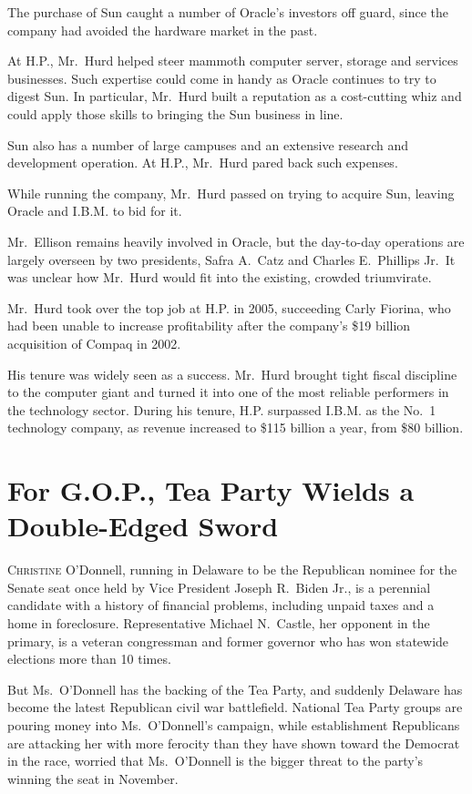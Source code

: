 ﻿\documentclass[12pt]{article}
\begin{document}
The purchase of Sun caught a number of Oracle's investors off guard, since the company had avoided
the hardware market in the past.

At H.P., Mr.~Hurd helped steer mammoth computer server, storage and services businesses. Such
expertise could come in handy as Oracle continues to try to digest Sun. In particular, Mr.~Hurd
built a reputation as a cost-cutting whiz and could apply those skills to bringing the Sun business
in line.

Sun also has a number of large campuses and an extensive research and development operation. At
H.P., Mr.~Hurd pared back such expenses.

While running the company, Mr.~Hurd passed on trying to acquire Sun, leaving Oracle and I.B.M. to
bid for it.

Mr.~Ellison remains heavily involved in Oracle, but the day-to-day operations are largely overseen
by two presidents, Safra A.~Catz and Charles E.~Phillips Jr.~It was unclear how Mr.~Hurd would fit
into the existing, crowded triumvirate.

Mr.~Hurd took over the top job at H.P. in 2005, succeeding Carly Fiorina, who had been unable to
increase profitability after the company's \$19 billion acquisition of Compaq in 2002.

His tenure was widely seen as a success. Mr.~Hurd brought tight fiscal discipline to the computer
giant and turned it into one of the most reliable performers in the technology sector. During his
tenure, H.P. surpassed I.B.M. as the No.~1 technology company, as revenue increased to \$115 billion
a year, from \$80 billion.

\pagebreak
\section{For G.O.P., Tea Party Wields a Double-Edged Sword}

\lettrine{C}{hristine} O'Donnell, running in Delaware to be the Republican
nominee for the Senate seat once held by Vice President Joseph R.~Biden Jr., is a perennial
candidate with a history of financial problems, including unpaid taxes and a home in foreclosure.
Representative Michael N.~Castle, her opponent in the primary, is a veteran congressman and former
governor who has won statewide elections more than 10 times.

But Ms.~O'Donnell has the backing of the Tea Party, and suddenly Delaware has become the latest
Republican civil war battlefield. National Tea Party groups are pouring money into Ms.~O'Donnell's
campaign, while establishment Republicans are attacking her with more ferocity than they have shown
toward the Democrat in the race, worried that Ms.~O'Donnell is the bigger threat to the party's
winning the seat in November.
\end{document}
